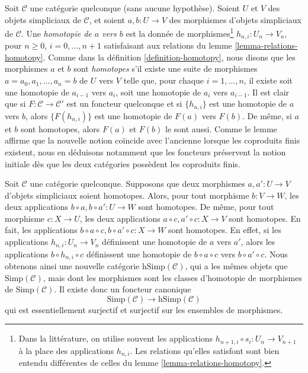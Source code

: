 \begin{remark}
\label{remark-homotopy-better}
Soit $\mathcal{C}$ une catégorie quelconque (sans aucune hypothèse).
Soient $U$ et $V$ des objets simpliciaux de $\mathcal{C}$, et soient
$a, b : U \to V$ des morphismes d'objets simpliciaux de $\mathcal{C}$.
Une {\it homotopie de $a$ vers $b$} est la donnée de
morphismes\footnote{Dans la littérature, on utilise souvent les applications
$h_{n + 1, i} \circ s_i : U_n \to V_{n + 1}$ à la place des
applications $h_{n, i}$. Les relations qu'elles satisfont sont bien entendu
différentes de celles du lemme \ref{lemma-relations-homotopy}.}
$h_{n, i} : U_n \to V_n$, pour $n \geq 0$, $i = 0, \ldots, n + 1$
satisfaisant aux relations du lemme \ref{lemma-relations-homotopy}.
Comme dans la définition \ref{definition-homotopy}, nous disons que les
morphismes $a$ et $b$ sont {\it homotopes} s'il existe une suite de morphismes
$a = a_0, a_1, \ldots, a_n = b$ de $U$ vers $V$ telle que, pour chaque
$i = 1, \ldots, n$, il existe soit une homotopie de $a_{i - 1}$ vers $a_i$,
soit une homotopie de $a_i$ vers $a_{i - 1}$.
Il est clair que si $F : \mathcal{C} \to \mathcal{C}'$ est un foncteur
quelconque et si $\{h_{n, i}\}$ est une homotopie de $a$ vers $b$, alors
$\{F(h_{n, i})\}$ est une homotopie de $F(a)$ vers $F(b)$.
De même, si $a$ et $b$ sont homotopes, alors $F(a)$ et $F(b)$
le sont aussi.
Comme le lemme affirme que la nouvelle notion coïncide avec l'ancienne
lorsque les coproduits finis existent, nous en déduisons notamment que les
foncteurs préservent la notion initiale dès que les deux catégories possèdent
les coproduits finis.
\end{remark}

\begin{remark}
\label{remark-homotopy-pre-post-compose}
Soit $\mathcal{C}$ une catégorie quelconque. Supposons que deux morphismes
$a, a' : U \to V$ d'objets simpliciaux soient homotopes. Alors, pour tout
morphisme $b : V \to W$, les deux applications
$b \circ a, b \circ a' : U \to W$ sont homotopes.
De même, pour tout morphisme $c : X \to U$, les deux applications
$a \circ c, a' \circ c : X \to V$ sont homotopes. En fait, les applications
$b \circ a \circ c, b \circ a' \circ c : X \to W$ sont homotopes.
En effet, si les applications $h_{n, i} : U_n \to V_n$ définissent une
homotopie de $a$ vers $a'$, alors les applications
$b \circ h_{n, i} \circ c$ définissent une homotopie de
$b \circ a \circ c$ vers $b \circ a' \circ c$. Nous obtenons ainsi une
nouvelle catégorie $\text{hSimp}(\mathcal{C})$, qui a les mêmes objets que
$\text{Simp}(\mathcal{C})$, mais dont les morphismes sont les classes
d'homotopie de morphismes de $\text{Simp}(\mathcal{C})$.
Il existe donc un foncteur canonique
$$
\text{Simp}(\mathcal{C})
\longrightarrow
\text{hSimp}(\mathcal{C})
$$
qui est essentiellement surjectif et surjectif sur les ensembles de morphismes.
\end{remark}

